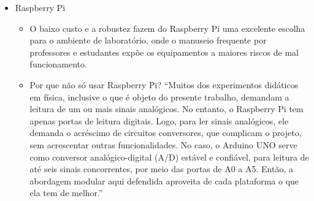 \documentclass{article}
\begin{document}
\begin{itemize}
\begin{itemize}
			\item Um detalhe técnico importante, que contribui para a adequação do Uno R3 aos experimentos didáticos, é a linearidade e a confiabilidade na leitura e conversão de sinais analógicos, em comparação com outras placas de desenvolvimento (Monk, 2024). \cite{rogerio}
			\item traz diversos fatores: o fato de ser \textit{open source,} altamente difundido, tendo potencial para educação; bastante econômico, e detalhes de sua arquitetura de \textit{hardware:} entradas para sensores de temperatura, luz, etc; saídas para LEDs, motores, etc. É possível citar aplicações mais relacionadas com o experimento em questão para embasar bem (posso trazer ideias de leitura analógica e digital). Eu posso citar Wi-Fi também, no caso da placa que utilizarei. Detalhes como interface com o computador e possibilidade de armazenamento local podem ser utilizados para logo a seguir eu introduzir Wi-Fi como funcionalidade que pode auxiliar telemetria (lembrar de também trazer a definição de telemetria) \cite{newton}
			\item Fatores que podem a auxiliar o público fora da área de desenvolvimento de software: fácil acesso a bibliotecas para integrar com \textit{hardware,} além de facilidade de programação com a Arduino IDE e gravação de programas na memória \textit{flash.} \cite{newton}
			\item Existem outras plataformas construídas para microcontroladores, mas o Arduino tem se destacado no cenário mundial pela facilidade de programação, versatilidade e baixo custo \cite{iniciantes}
			\item Baixo custo reportado de um experimento reportado em \cite{kit}. Pode ser algo importante que eu possa fazer.
		\end{itemize}
	\item{Raspberry Pi}
		\begin{itemize}
			\item O baixo custo e a robustez fazem do Raspberry Pi uma excelente escolha para o ambiente de laboratório, onde o manuseio frequente por professores e estudantes expõe os equipamentos a maiores riscos de mal funcionamento. \cite{rogerio}
			\item Por que não só usar Raspberry Pi? ``Muitos dos experimentos didáticos em física, inclusive o que é objeto do presente trabalho, demandam a leitura de um ou mais sinais analógicos. No entanto, o Raspberry Pi tem apenas portas de leitura digitais. Logo, para ler sinais analógicos, ele demanda o acréscimo de circuitos conversores, que complicam o projeto, sem acrescentar outras funcionalidades. No caso, o Arduino UNO serve como conversor analógico-digital (A/D) estável e confiável, para leitura de até seis sinais concorrentes, por meio das portas de A0 a A5. Então, a abordagem modular aqui defendida aproveita de cada plataforma o que ela tem de melhor.'' \cite{rogerio}

\end{itemize}
\end{itemize}
\end{document}
